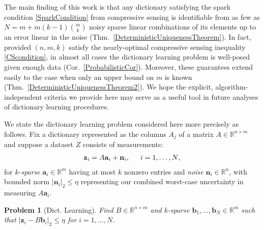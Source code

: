 \documentclass[journal, twocolumn]{IEEEtran}
\newtheorem{problem}{Problem}
\begin{document}
The main finding of this work is that any dictionary satisfying the spark condition \eqref{SparkCondition} from compressive sensing is identifiable from as few as $N = m + m(k-1){m \choose k}$ noisy sparse linear combinations of its elements up to an error linear in the noise (Thm.~\ref{DeterministicUniquenessTheorem}). In fact, provided $(n, m, k)$ satisfy the nearly-optimal compressive sensing inequality \eqref{CScondition}, in almost all cases the dictionary learning problem is well-posed given enough data (Cor.~\ref{ProbabilisticCor}). Moreover, these guarantees extend easily to the case when only an upper bound on $m$ is known (Thm.~\ref{DeterministicUniquenessTheorem2}). We hope the explicit, algorithm-independent criteria we provide here may serve as a useful tool in future analyses of dictionary learning procedures.


We state the dictionary learning problem considered here more precisely as follows. Fix a dictionary represented as the columns $A_j$ of a matrix $A \in \mathbb R^{n \times m}$ and suppose a dataset $Z$ consists of measurements:
\begin{align}\label{LinearModel}
\mathbf{z}_i = A\mathbf{a}_i + \mathbf{n}_i,\indent \text{$i=1,\ldots,N$},
\end{align}
for $k$-\emph{sparse} $\mathbf{a}_i \in \mathbb{R}^m$ having at most $k$ nonzero entries and \emph{noise} $\mathbf{n}_i \in \mathbb{R}^n$, with bounded norm $| \mathbf{n}_i |_2 \leq  \eta$ representing our combined worst-case uncertainty in  measuring $A\mathbf{a}_i$.

\begin{problem}[Dict. Learning]\label{InverseProblem}
Find $B \in \mathbb{R}^{n \times m}$ and $k$-sparse $\mathbf{b}_1, \ldots, \mathbf{b}_N \in \mathbb{R}^m$ such that $|\mathbf{z}_i - B\mathbf{b}_i|_2 \leq \eta$ for $i = 1, \ldots, N$.
\end{problem}
\end{document}
